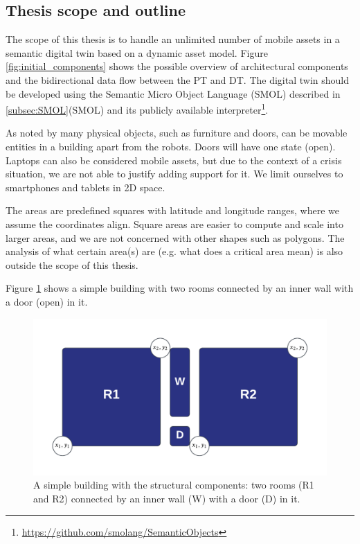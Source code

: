 \documentclass{article}
\begin{document}
\subsection{Thesis scope and outline}\label{subsec:Scope}
The scope of this thesis is to handle an unlimited number of mobile assets in a semantic digital twin based on a dynamic asset model. Figure \ref{fig:initial_components} shows the possible overview of architectural components and the bidirectional data flow between the PT and DT. The digital twin should be developed using the Semantic Micro Object Language (SMOL) described in \ref{subsec:SMOL}(SMOL) and its publicly available interpreter\footnote{\url{https://github.com/smolang/SemanticObjects}}.

As noted by \citeauthor{pauwels_live_2023} many physical objects, such as furniture and doors, can be movable entities in a building apart from the robots. Doors will have one state (open). Laptops can also be considered mobile assets, but due to the context of a crisis situation, we are not able to justify adding support for it. We limit ourselves to smartphones and tablets in 2D space.  

The areas are predefined squares with latitude and longitude ranges, where we assume the coordinates align. Square areas are easier to compute and scale into larger areas, and we are not concerned with other shapes such as polygons. The analysis of what certain area(s) are (e.g. what does a critical area mean) is also outside the scope of this thesis.

Figure \ref{fig:simple_building} shows a simple building with two rooms connected by an inner wall with a door (open) in it.

\begin{figure}[H]
    \centering
    \includegraphics[scale=0.3]{graphics/simple_building.png}
    \caption{A simple building with the structural components: two rooms (R1 and R2) connected by an inner wall (W) with a door (D) in it.}
    \label{fig:simple_building}
\end{figure}
\end{document}
